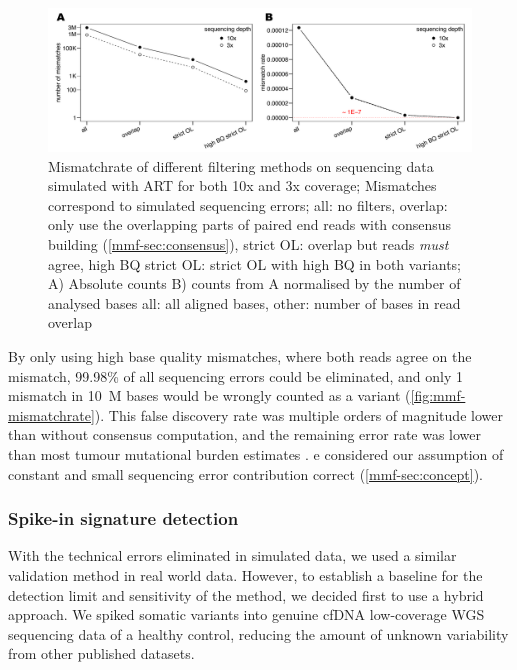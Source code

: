 \begin{figure}[ht]
\centering
\includegraphics[width=.99\linewidth]{Figures/MisMatchFinder/mismatchrateCleanSequencing.pdf}
\caption[Mismatchrate of different filtering methods]{Mismatchrate of different filtering methods on sequencing data simulated with ART\cite{Huang2011} for both 10x and 3x coverage; Mismatches correspond to simulated sequencing errors; all: no filters, overlap: only use the overlapping parts of paired end reads with consensus building (\protect\autoref{mmf-sec:consensus}), strict OL: overlap but reads \emph{must} agree, high BQ strict OL: strict OL with high BQ in both variants; A) Absolute counts B) counts from A normalised by the number of analysed bases all: all aligned bases, other: number of bases in read overlap}\label{fig:mmf-mismatchrate}
\end{figure}

By only using high base quality mismatches, where both reads agree on the mismatch, 99.98\% of all sequencing errors could be eliminated, and only 1 mismatch in 10~M bases would be wrongly counted as a variant (\autoref{fig:mmf-mismatchrate}). This false discovery rate was multiple orders of magnitude lower than without consensus computation, and the remaining error rate was lower than most tumour mutational burden estimates \cite{Alexandrov2020,Lawrence2013a}. e  considered our assumption of constant and small sequencing error contribution  correct (\autoref{mmf-sec:concept}).


\subsubsection{Spike-in signature detection}
\label{mmf-sec:simSignatures}
With the technical errors eliminated in simulated data, we used a similar validation method in real world data. However, to  establish a baseline for the detection limit and sensitivity of the method, we decided first to use a hybrid approach. We spiked somatic variants into genuine cfDNA low-coverage WGS sequencing data of a healthy control, reducing the amount of unknown variability from other published datasets.

